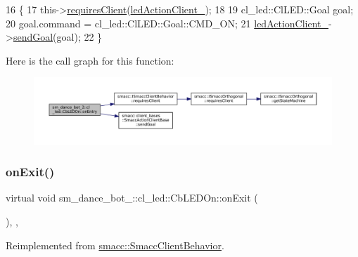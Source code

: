 \begin{DoxyCode}
16   \{
17     this->\hyperlink{classsmacc_1_1ISmaccClientBehavior_a32b16e99e3b4cb289414203dc861a440}{requiresClient}(\hyperlink{classsm__dance__bot__2_1_1cl__led_1_1CbLEDOn_aceeb4355c0578e62047388ad21c9df8b}{ledActionClient\_});
18 
19     cl\_led::ClLED::Goal goal;
20     goal.command = cl\_led::ClLED::Goal::CMD\_ON;
21     \hyperlink{classsm__dance__bot__2_1_1cl__led_1_1CbLEDOn_aceeb4355c0578e62047388ad21c9df8b}{ledActionClient\_}->\hyperlink{classsmacc_1_1client__bases_1_1SmaccActionClientBase_a9c47a5094ac8afb01680307fe5eca922}{sendGoal}(goal);
22   \}
\end{DoxyCode}
Here is the call graph for this function\+:
\nopagebreak
\begin{figure}[H]
\begin{center}
\leavevmode
\includegraphics[width=350pt]{classsm__dance__bot__2_1_1cl__led_1_1CbLEDOn_adee6590f4b50a9cf26cf22f6e39b7965_cgraph}
\end{center}
\end{figure}
\mbox{\label{classsm__dance__bot__2_1_1cl__led_1_1CbLEDOn_a461d3e1829d785ab490fce9827868e39}} 
\subsubsection{\texorpdfstring{on\+Exit()}{onExit()}}
{\footnotesize\ttfamily virtual void sm\+\_\+dance\+\_\+bot\+\_\+::cl\+\_\+led\+::\+Cb\+L\+E\+D\+On\+::on\+Exit (\begin{DoxyParamCaption}{ }\end{DoxyParamCaption})\hspace{0.3cm}{\ttfamily [inline]}, {\ttfamily [override]}, {\ttfamily [virtual]}}



Reimplemented from \hyperlink{classsmacc_1_1SmaccClientBehavior_a7e4fb6ce81ff96dc172425852d69c0c5}{smacc\+::\+Smacc\+Client\+Behavior}.



